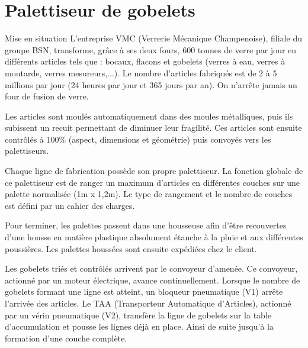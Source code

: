 


\section{Palettiseur de gobelets}


Mise en situation
L'entreprise VMC (Verrerie Mécanique Champenoise), filiale du groupe BSN, transforme, grâce à ses deux fours, 600 tonnes de verre par jour en différents articles tels que : bocaux, flacons et gobelets (verres à eau, verres à moutarde, verres mesureurs,...). Le nombre d'articles fabriqués est de 2 à 5 millions par jour (24 heures par jour et 365 jours par an). On n'arrête jamais un four de fusion de verre.

Les articles sont moulés automatiquement dans des moules métalliques, puis ils subissent un recuit permettant de diminuer leur fragilité. Ces articles sont ensuite contrôlés à 100\% (aspect, dimensions et géométrie) puis convoyés vers les palettiseurs.

Chaque ligne de fabrication possède son propre palettiseur. La fonction globale de ce palettiseur est de ranger un maximum d'articles en différentes couches sur une palette normalisée (1m x 1,2m). Le type de rangement et le nombre de couches est défini par un cahier des charges.

Pour terminer, les palettes passent dans une housseuse afin d'être recouvertes d'une housse en matière plastique absolument étanche à la pluie et aux différentes poussières. Les palettes houssées sont ensuite expédiées chez le client.

Les gobelets triés et contrôlés arrivent par le convoyeur d'amenée. Ce convoyeur, actionné par un moteur électrique, avance continuellement. Lorsque le nombre de gobelets formant une ligne est atteint, un bloqueur pneumatique (V1) arrête l'arrivée des articles. Le TAA (Transporteur Automatique d'Articles), actionné par un vérin pneumatique (V2), transfère la ligne de gobelets sur la table d'accumulation et pousse les lignes déjà en place. Ainsi de suite jusqu'à la formation
d'une couche complète.

